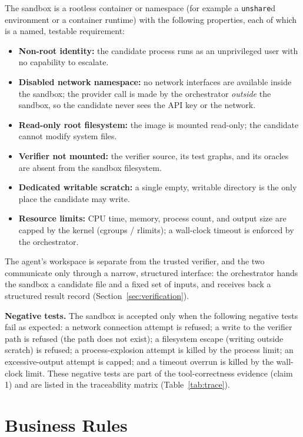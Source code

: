 \documentclass[12pt,a4paper]{article}
\begin{document}
The sandbox is a rootless container or namespace (for example a \texttt{unshare}d environment or a container runtime) with the following properties, each of which is a named, testable requirement:

\begin{itemize}[noitemsep]
  \item \textbf{Non-root identity:} the candidate process runs as an unprivileged user with no capability to escalate.
  \item \textbf{Disabled network namespace:} no network interfaces are available inside the sandbox; the provider call is made by the orchestrator \emph{outside} the sandbox, so the candidate never sees the API key or the network.
  \item \textbf{Read-only root filesystem:} the image is mounted read-only; the candidate cannot modify system files.
  \item \textbf{Verifier not mounted:} the verifier source, its test graphs, and its oracles are absent from the sandbox filesystem.
  \item \textbf{Dedicated writable scratch:} a single empty, writable directory is the only place the candidate may write.
  \item \textbf{Resource limits:} CPU time, memory, process count, and output size are capped by the kernel (cgroups / rlimits); a wall-clock timeout is enforced by the orchestrator.
\end{itemize}

The agent's workspace is separate from the trusted verifier, and the two communicate only through a narrow, structured interface: the orchestrator hands the sandbox a candidate file and a fixed set of inputs, and receives back a structured result record (Section~\ref{sec:verification}).

\textbf{Negative tests.} The sandbox is accepted only when the following negative tests fail as expected: a network connection attempt is refused; a write to the verifier path is refused (the path does not exist); a filesystem escape (writing outside scratch) is refused; a process-explosion attempt is killed by the process limit; an excessive-output attempt is capped; and a timeout overrun is killed by the wall-clock limit. These negative tests are part of the tool-correctness evidence (claim 1) and are listed in the traceability matrix (Table~\ref{tab:trace}).

\section{Business Rules}
\label{sec:business}
\end{document}
